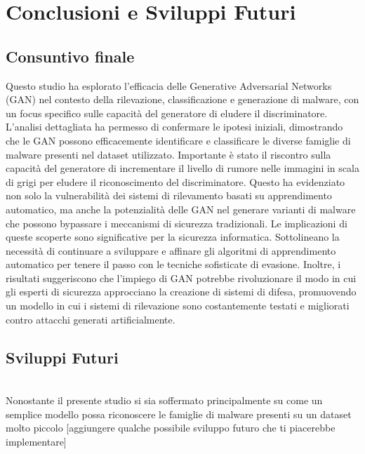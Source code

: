 \chapter{Conclusioni e Sviluppi Futuri}
\label{cap:conclusioni}
\section{Consuntivo finale}
Questo studio ha esplorato l'efficacia delle Generative Adversarial Networks (GAN) nel contesto della rilevazione, classificazione e generazione di malware, con un focus specifico sulle capacità del generatore di eludere il discriminatore. L'analisi dettagliata ha permesso di confermare le ipotesi iniziali, dimostrando che le GAN possono efficacemente identificare e classificare le diverse famiglie di malware presenti nel dataset utilizzato.
Importante è stato il riscontro sulla capacità del generatore di incrementare il livello di rumore nelle immagini in scala di grigi per eludere il riconoscimento del discriminatore. Questo ha evidenziato non solo la vulnerabilità dei sistemi di rilevamento basati su apprendimento automatico, ma anche la potenzialità delle GAN nel generare varianti di malware che possono bypassare i meccanismi di sicurezza tradizionali.
Le implicazioni di queste scoperte sono significative per la sicurezza informatica. Sottolineano la necessità di continuare a sviluppare e affinare gli algoritmi di apprendimento automatico per tenere il passo con le tecniche sofisticate di evasione. Inoltre, i risultati suggeriscono che l'impiego di GAN potrebbe rivoluzionare il modo in cui gli esperti di sicurezza approcciano la creazione di sistemi di difesa, promuovendo un modello in cui i sistemi di rilevazione sono costantemente testati e migliorati contro attacchi generati artificialmente.

\section{Sviluppi Futuri}
~\\
\indent Nonostante il presente studio si sia soffermato principalmente su come un semplice modello possa riconoscere le famiglie di malware presenti su un dataset molto piccolo
[aggiungere qualche possibile sviluppo futuro che ti piacerebbe implementare]
